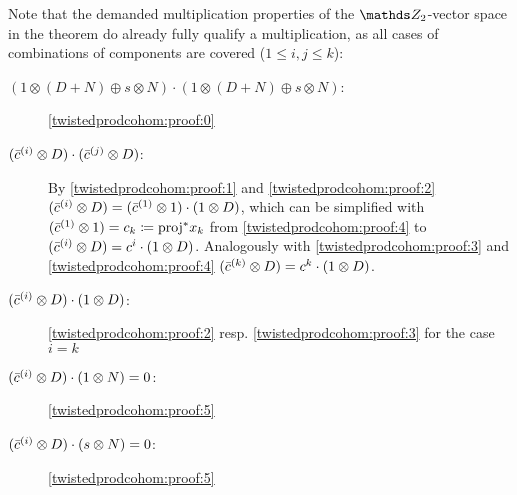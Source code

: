 \begin{Rem}
  Note that the demanded multiplication properties of the
  $\Zmod2$-vector space in the theorem do already fully qualify a
  multiplication, as all cases of combinations of components are
  covered ($1\leq i,j\leq k$):
  \begin{description}
  \item[$(1\otimes(D+N)\oplus s\otimes N)\cdot (1\otimes(D+N)\oplus s\otimes N)$:]
    \ref{twistedprodcohom:proof:0}
  \item[$(\bar c^{(i)}\otimes D)\cdot (\bar c^{(j)}\otimes D)$:]
    By \ref{twistedprodcohom:proof:1} and \ref{twistedprodcohom:proof:2}
    $(\bar c^{(i)}\otimes D)=(\bar c^{(1)}\otimes 1)\cdot (1\otimes D)$,
    which can be simplified with
    $(\bar c^{(1)}\otimes 1)=c_k\coloneqq {\mathrm{proj}}^* x_k$
    from \ref{twistedprodcohom:proof:4}
    to $(\bar c^{(i)}\otimes D)=c^i\cdot(1\otimes D)$.
    Analogously with \ref{twistedprodcohom:proof:3}
    and \ref{twistedprodcohom:proof:4}
    $(\bar c^{(k)}\otimes D) = c^k\cdot(1\otimes D)$.
  \item[$(\bar c^{(i)}\otimes D)\cdot (1\otimes D)$:]
    \ref{twistedprodcohom:proof:2} resp. \ref{twistedprodcohom:proof:3}
    for the case $i=k$
  \item[$(\bar c^{(i)}\otimes D)\cdot (1\otimes N) = 0$:]
    \ref{twistedprodcohom:proof:5}
  \item[$(\bar c^{(i)}\otimes D)\cdot (s\otimes N) = 0$:]
    \ref{twistedprodcohom:proof:5}
  \end{description}
\end{Rem}
